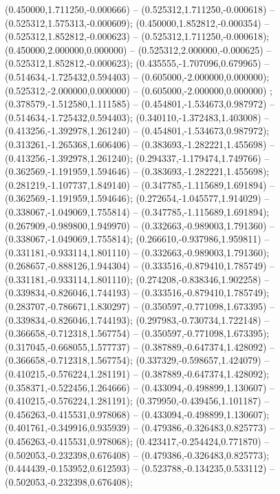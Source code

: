  (0.450000,1.711250,-0.000666) -- (0.525312,1.711250,-0.000618) -- (0.525312,1.575313,-0.000609);
 (0.450000,1.852812,-0.000354) -- (0.525312,1.852812,-0.000623) -- (0.525312,1.711250,-0.000618);
 (0.450000,2.000000,0.000000) -- (0.525312,2.000000,-0.000625) -- (0.525312,1.852812,-0.000623);
 (0.435555,-1.707096,0.679965) -- (0.514634,-1.725432,0.594403) -- (0.605000,-2.000000,0.000000);
 (0.525312,-2.000000,0.000000) -- (0.605000,-2.000000,0.000000) ;
 (0.378579,-1.512580,1.111585) -- (0.454801,-1.534673,0.987972) -- (0.514634,-1.725432,0.594403);
 (0.340110,-1.372483,1.403008) -- (0.413256,-1.392978,1.261240) -- (0.454801,-1.534673,0.987972);
 (0.313261,-1.265368,1.606406) -- (0.383693,-1.282221,1.455698) -- (0.413256,-1.392978,1.261240);
 (0.294337,-1.179474,1.749766) -- (0.362569,-1.191959,1.594646) -- (0.383693,-1.282221,1.455698);
 (0.281219,-1.107737,1.849140) -- (0.347785,-1.115689,1.691894) -- (0.362569,-1.191959,1.594646);
 (0.272654,-1.045577,1.914029) -- (0.338067,-1.049069,1.755814) -- (0.347785,-1.115689,1.691894);
 (0.267909,-0.989800,1.949970) -- (0.332663,-0.989003,1.791360) -- (0.338067,-1.049069,1.755814);
 (0.266610,-0.937986,1.959811) -- (0.331181,-0.933114,1.801110) -- (0.332663,-0.989003,1.791360);
 (0.268657,-0.888126,1.944304) -- (0.333516,-0.879410,1.785749) -- (0.331181,-0.933114,1.801110);
 (0.274208,-0.838346,1.902258) -- (0.339834,-0.826046,1.744193) -- (0.333516,-0.879410,1.785749);
 (0.283707,-0.786671,1.830297) -- (0.350597,-0.771098,1.673395) -- (0.339834,-0.826046,1.744193);
 (0.297983,-0.730734,1.722148) -- (0.366658,-0.712318,1.567754) -- (0.350597,-0.771098,1.673395);
 (0.317045,-0.668055,1.577737) -- (0.387889,-0.647374,1.428092) -- (0.366658,-0.712318,1.567754);
 (0.337329,-0.598657,1.424079) -- (0.410215,-0.576224,1.281191) -- (0.387889,-0.647374,1.428092);
 (0.358371,-0.522456,1.264666) -- (0.433094,-0.498899,1.130607) -- (0.410215,-0.576224,1.281191);
 (0.379950,-0.439456,1.101187) -- (0.456263,-0.415531,0.978068) -- (0.433094,-0.498899,1.130607);
 (0.401761,-0.349916,0.935939) -- (0.479386,-0.326483,0.825773) -- (0.456263,-0.415531,0.978068);
 (0.423417,-0.254424,0.771870) -- (0.502053,-0.232398,0.676408) -- (0.479386,-0.326483,0.825773);
 (0.444439,-0.153952,0.612593) -- (0.523788,-0.134235,0.533112) -- (0.502053,-0.232398,0.676408);

